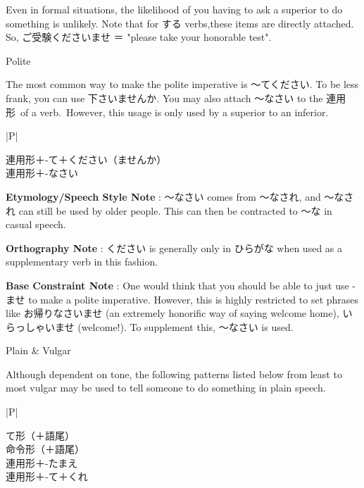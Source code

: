 \par{Even in formal situations, the likelihood of you having to ask a superior to do something is unlikely. Note that for する verbs,these items are directly attached. So, ご受験くださいませ ＝ "please take your honorable test". }

\par{Polite  }

\par{The most common way to make the polite imperative is ～てください. To be less frank, you can use 下さいませんか. You may also attach ～なさい to the 連用形 of a verb. However, this usage is only used by a superior to an inferior. }

\begin{ltabulary}{|P|}
\hline 

連用形＋-て＋ください（ませんか） \\

連用形＋-なさい \\

\end{ltabulary}

\par{\textbf{Etymology\slash Speech Style Note }: ～なさい comes from ～なされ, and ～なされ can still be used by older people. This can then be contracted to ～な in casual speech. }

\par{\textbf{Orthography Note }: ください is generally only in ひらがな when used as a supplementary verb in this fashion. }

\par{\textbf{Base Constraint Note }: One would think that you should be able to just use -ませ to make a polite imperative. However, this is highly restricted to set phrases like お帰りなさいませ (an extremely honorific way of saying welcome home), いらっしゃいませ (welcome!). To supplement this, ～なさい is used. }

\par{Plain \& Vulgar }

\par{Although dependent on tone, the following patterns listed below from least to most vulgar may be used to tell someone to do something in plain speech. }

\begin{ltabulary}{|P|}
\hline 

て形（＋語尾） \\

命令形（＋語尾） \\

連用形＋-たまえ \\

連用形＋-て＋くれ \\

\end{ltabulary}

